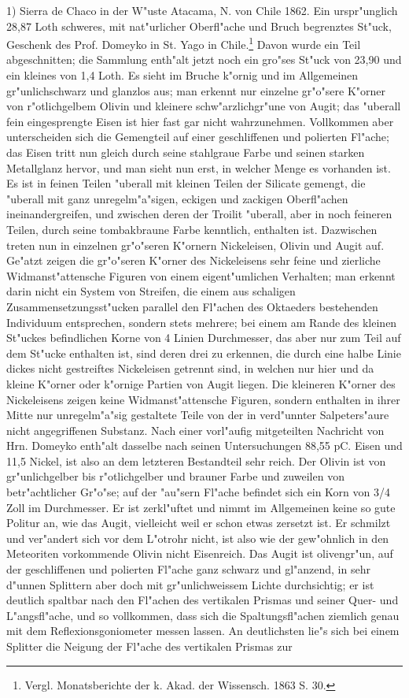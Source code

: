 \documentclass[a4paper, 11pt, oneside]{article}
\begin{document}
1) Sierra de Chaco in der W"uste Atacama, N. von Chile 1862. Ein urspr"unglich 28,87 Loth schweres, mit nat"urlicher Oberfl"ache und Bruch begrenztes St"uck, Geschenk des Prof. Domeyko in St. Yago in Chile.\footnote{Vergl. Monatsberichte der k. Akad. der Wissensch. 1863 S. 30.} Davon wurde ein Teil abgeschnitten; die Sammlung enth"alt jetzt noch ein gro"ses St"uck von 23,90 und ein kleines von 1,4 Loth. Es sieht im Bruche k"ornig und im Allgemeinen gr"unlichschwarz und glanzlos aus; man erkennt nur einzelne gr"o"sere K"orner von r"otlichgelbem Olivin und kleinere schw"arzlichgr"une von Augit; das "uberall fein eingesprengte Eisen ist hier fast gar nicht wahrzunehmen. Vollkommen aber unterscheiden sich die Gemengteil auf einer geschliffenen und polierten Fl"ache; das Eisen tritt nun gleich durch seine stahlgraue Farbe und seinen starken Metallglanz hervor, und man sieht nun erst, in welcher Menge es vorhanden ist. Es ist in feinen Teilen "uberall mit kleinen Teilen der Silicate gemengt, die "uberall mit ganz unregelm"a"sigen, eckigen und zackigen Oberfl"achen ineinandergreifen, und zwischen deren der Troilit "uberall, aber in noch feineren Teilen, durch seine tombakbraune Farbe kenntlich, enthalten ist. Dazwischen treten nun in einzelnen gr"o"seren K"ornern Nickeleisen, Olivin und Augit auf. Ge"atzt zeigen die gr"o"seren K"orner des Nickeleisens sehr feine und zierliche Widmanst"attensche Figuren von einem eigent"umlichen Verhalten; man erkennt darin nicht ein System von Streifen, die einem aus schaligen Zusammensetzungsst"ucken parallel den Fl"achen des Oktaeders bestehenden Individuum entsprechen, sondern stets mehrere; bei einem am Rande des kleinen St"uckes befindlichen Korne von 4 Linien Durchmesser, das aber nur zum Teil auf dem St"ucke enthalten ist, sind deren drei zu erkennen, die durch eine halbe Linie dickes nicht gestreiftes Nickeleisen getrennt sind, in welchen nur hier und da kleine K"orner oder k"ornige Partien von Augit liegen. Die kleineren K"orner des Nickeleisens zeigen keine Widmanst"attensche Figuren, sondern enthalten in ihrer Mitte nur unregelm"a"sig gestaltete Teile von der in verd"unnter Salpeters"aure nicht angegriffenen Substanz. Nach einer vorl"aufig mitgeteilten Nachricht von Hrn. Domeyko enth"alt dasselbe nach seinen Untersuchungen 88,55 pC. Eisen und 11,5 Nickel, ist also an dem letzteren Bestandteil sehr reich. Der Olivin ist von gr"unlichgelber bis r"otlichgelber und brauner Farbe und zuweilen von betr"achtlicher Gr"o"se; auf der "au"sern Fl"ache befindet sich ein Korn von 3/4 Zoll im Durchmesser. Er ist zerkl"uftet und nimmt im Allgemeinen keine so gute Politur an, wie das Augit, vielleicht weil er schon etwas zersetzt ist. Er schmilzt und ver"andert sich vor dem L"otrohr nicht, ist also wie der gew"ohnlich in den Meteoriten vorkommende Olivin nicht Eisenreich. Das Augit ist olivengr"un, auf der geschliffenen und polierten Fl"ache ganz schwarz und gl"anzend, in sehr d"unnen Splittern aber doch mit gr"unlichweissem Lichte durchsichtig; er ist deutlich spaltbar nach den Fl"achen des vertikalen Prismas und seiner Quer- und L"angsfl"ache, und so vollkommen, dass sich die Spaltungsfl"achen ziemlich genau mit dem Reflexionsgoniometer messen lassen. An deutlichsten lie"s sich bei einem Splitter die Neigung der Fl"ache des vertikalen Prismas zur 
\end{document}
